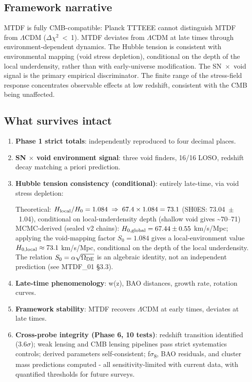 \documentclass[11pt,a4paper]{article}
\begin{document}
\endgroup

\subsection{Framework narrative}
\begin{mdframed}[linecolor=accent,linewidth=0.5pt,backgroundcolor=callout-bg,leftline=true,rightline=true,topline=true,bottomline=true,innerleftmargin=8pt,innerrightmargin=8pt,innertopmargin=6pt,innerbottommargin=6pt]
MTDF is fully CMB-compatible: Planck TTTEEE cannot distinguish MTDF from $\Lambda$CDM ($\Delta$$\chi$$^{2}$~<~1). MTDF deviates from $\Lambda$CDM at late times through environment-dependent dynamics. The Hubble tension is consistent with environmental mapping (void stress depletion), conditional on the depth of the local underdensity, rather than with early-universe modification. The SN~$\times$~void signal is the primary empirical discriminator. The finite range of the stress-field response concentrates observable effects at low redshift, consistent with the CMB being unaffected.
\end{mdframed}

\subsection{What survives intact}
\begin{enumerate}
  \item \textbf{Phase 1 strict totals}: independently reproduced to four decimal places.
  \item \textbf{SN $\times$ void environment signal}: three void finders, 16/\allowbreak{}16 LOSO, redshift decay matching a priori prediction.
  \item \textbf{Hubble tension consistency (conditional)}: entirely late-time, via void stress depletion:
    
Theoretical: \( H_{\rm local}/H_0 = 1.084 \;\Rightarrow\; 67.4 \times 1.084 = 73.1 \) (SH0ES: 73.04~$\pm$~1.04), conditional on local-underdensity depth (shallow void gives \~{}70--71)
MCMC-derived (sealed v2 chains): \( H_{0,\rm global} = 67.44 \pm 0.55 \) km/\allowbreak{}s/\allowbreak{}Mpc; applying the void-mapping factor \( S_0 = 1.084 \) gives a local-environment value \( H_{0,\rm local} \approx 73.1 \) km/\allowbreak{}s/\allowbreak{}Mpc, conditional on the depth of the local underdensity. The relation \( S_0 = \alpha\sqrt{\Omega_{\rm DE}} \) is an algebraic identity, not an independent prediction (see MTDF\_\allowbreak{}01 \S{}3.3).
  \item \textbf{Late-time phenomenology}: w(z), BAO distances, growth rate, rotation curves.
  \item \textbf{Framework stability}: MTDF recovers $\Lambda$CDM at early times, deviates at late times.
  \item \textbf{Cross-probe integrity (Phase 6, 10 tests)}: redshift transition identified (3.6$\sigma$); weak lensing and CMB lensing pipelines pass strict systematics controls; derived parameters self-consistent; f$\sigma$\textsubscript{8}, BAO residuals, and cluster mass predictions computed  -  all sensitivity-limited with current data, with quantified thresholds for future surveys.
\end{enumerate}
\end{document}
